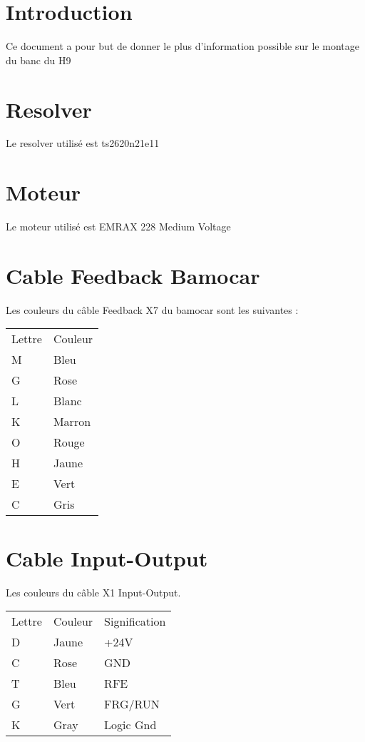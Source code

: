 \documentclass{EPSA-rap-template}
\begin{document}
\fairepagedegarde
\newpage
\tableofcontents

\section{Introduction}

Ce document a pour but de donner le plus d'information possible sur le montage du banc du H9

\section{Resolver}

Le resolver utilisé est ts2620n21e11 

\section{Moteur}

Le moteur utilisé est EMRAX 228 Medium Voltage


\section{Cable Feedback Bamocar}

Les couleurs du câble Feedback X7 du bamocar sont les suivantes : 

\begin{tabular}{ll}

Lettre & Couleur \\
M & Bleu \\
G & Rose \\
L & Blanc \\
K & Marron \\
O & Rouge \\
H & Jaune \\
E & Vert \\
C & Gris \\

\end{tabular}

\section{Cable Input-Output}

Les couleurs du câble X1 Input-Output.

\begin{tabular}{lll}

Lettre & Couleur & Signification \\
D & Jaune & +24V \\
C & Rose & GND \\
T & Bleu & RFE \\
G & Vert & FRG/RUN \\
K & Gray & Logic Gnd \\

\end{tabular}
\end{document}
